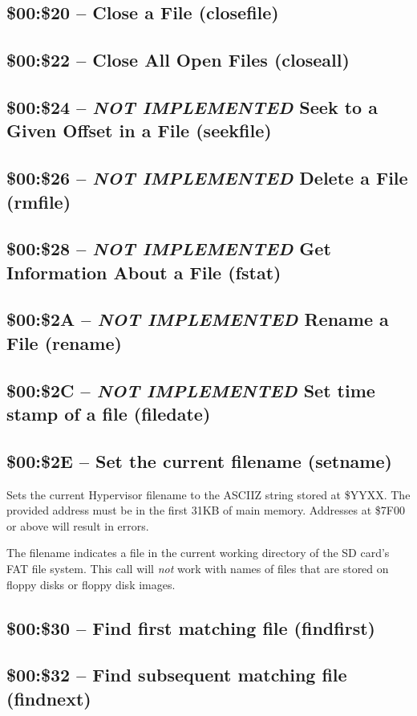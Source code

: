 \subsection{\$00:\$20 -- Close a File (closefile)}
\subsection{\$00:\$22 -- Close All Open Files (closeall)}
\subsection{\$00:\$24 -- {\em NOT IMPLEMENTED} Seek to a Given Offset in a File (seekfile)}
\subsection{\$00:\$26 -- {\em NOT IMPLEMENTED} Delete a File (rmfile)}
\subsection{\$00:\$28 -- {\em NOT IMPLEMENTED} Get Information About a File (fstat)}
\subsection{\$00:\$2A -- {\em NOT IMPLEMENTED} Rename a File (rename)}
\subsection{\$00:\$2C -- {\em NOT IMPLEMENTED} Set time stamp of a file (filedate)}
\subsection{\$00:\$2E -- Set the current filename (setname)}

Sets the current Hypervisor filename to the ASCIIZ string stored at \$YYXX. The provided address
must be in the first 31KB of main memory.  Addresses at \$7F00 or above will result in errors.

The filename indicates a file in the current working directory of the SD card's FAT file system.
This call will {\em not} work with names of files that are stored on floppy disks or floppy disk
images.  

\subsection{\$00:\$30 -- Find first matching file (findfirst)}
\subsection{\$00:\$32 -- Find subsequent matching file (findnext)}
